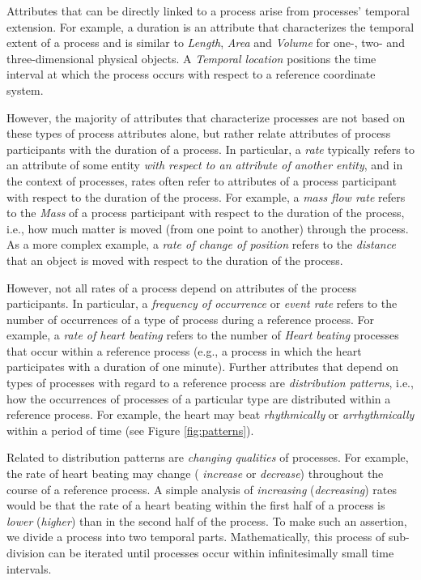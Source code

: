 \documentclass[12pt]{article}
\begin{document}
Attributes that can be directly linked to a process arise from
processes' temporal extension. For example, a duration is an attribute
that characterizes the temporal extent of a process and is similar to
{\em Length}, {\em Area} and {\em Volume} for one-, two- and
three-dimensional physical objects. A {\em Temporal location}
positions the time interval at which the process occurs with respect
to a reference coordinate system.

However, the majority of attributes that characterize processes are
not based on these types of process attributes alone, but rather
relate attributes of process participants with the duration of a
process. In particular, a {\em rate} typically refers to an attribute
of some entity {\em with respect to an attribute of another entity},
and in the context of processes, rates often refer to attributes of a
process participant with respect to the duration of the process. For
example, a {\em mass flow rate} refers to the {\em Mass} of a process
participant with respect to the duration of the process, i.e., how
much matter is moved (from one point to another) through the process.
As a more complex example, a {\em rate of change of position} refers
to the {\em distance} that an object is moved with respect to the
duration of the process.

However, not all rates of a process depend on attributes of the
process participants. In particular, a {\em frequency of occurrence}
or {\em event rate} refers to the number of occurrences of a type of
process during a reference process. For example, a {\em rate of heart
  beating} refers to the number of {\em Heart beating} processes that
occur within a reference process (e.g., a process in which the heart
participates with a duration of one minute). Further attributes that
depend on types of processes with regard to a reference process are
{\em distribution patterns}, i.e., how the occurrences of processes of
a particular type are distributed within a reference process. For
example, the heart may beat {\em rhythmically} or {\em arrhythmically}
within a period of time (see Figure \ref{fig:patterns}).

Related to distribution patterns are {\em changing qualities} of
processes. For example, the rate of heart beating may change ({\em
  increase} or {\em decrease}) throughout the course of a reference
process. A simple analysis of {\em increasing} ({\em decreasing})
rates would be that the rate of a heart beating within the first half
of a process is {\em lower} ({\em higher}) than in the second half of
the process. To make such an assertion, we divide a process into two
temporal parts. Mathematically, this process of sub-division can be
iterated until processes occur within infinitesimally small time
intervals.
\end{document}
